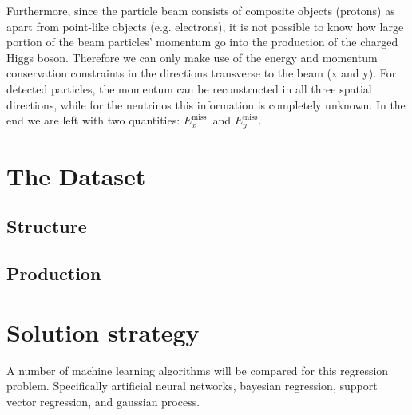\documentclass{scrartcl}
\newcommand{\exmiss}{$E_x^\text{miss}$}
\newcommand{\eymiss}{$E_y^\text{miss}$}
\begin{document}
Furthermore, since the particle beam consists of composite objects (protons) as apart from point-like objects (e.g. electrons), it is not possible to know how large portion of the beam particles' momentum go into the production of the charged Higgs boson. Therefore we can only make use of the energy and momentum conservation constraints in the directions transverse to the beam (x and y). For detected particles, the momentum can be reconstructed in all three spatial directions, while for the neutrinos this information is completely unknown. In the end we are left with two quantities: \exmiss\ and \eymiss.

\section{The Dataset}
\subsection{Structure}

\subsection{Production}


\section{Solution strategy}
A number of machine learning algorithms will be compared for this regression problem. Specifically artificial neural networks, bayesian regression, support vector regression, and gaussian process.


% 
\end{document}
